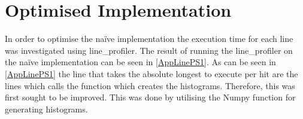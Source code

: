 \section{Optimised Implementation}
In order to optimise the na\"ive implementation the execution time for each line was investigated using line_profiler. The result of running the line_profiler on the na\"ive implementation can be seen in \autoref{AppLinePS1}. As can be seen in \autoref{AppLinePS1} the line that takes the absolute longest to execute per hit are the lines which calls the function which creates the histograms. Therefore, this was first sought to be improved. This was done by utilising the Numpy function for generating histograms.     
